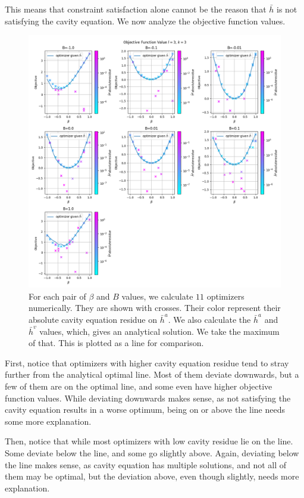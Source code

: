 \documentclass[12pt]{article}
\numberwithin{equation}{section}
\begin{document}
This means that constraint satisfaction alone cannot be the reason that $\bar{h}$ is not satisfying the cavity equation.
We now analyze the objective function values.
\begin{figure}[!h]
    \centering
    \includegraphics[width=18cm]{img/Ising_bptt/OBJ_l=3_k=3.png}
    \caption{For each pair of $\beta$ and $B$ values, we calculate $11$ optimizers numerically. They are shown with crosses.
        Their color represent their absolute cavity equation residue on $\bar{h}^a$. We also calculate the $\bar{h}^a$ and
        $\bar{h}^v$ values, which, gives an analytical solution. We take the maximum of that. This is plotted as a line for comparison.}
    \label{Fig.ISBP-OBJ-l3k3}
\end{figure}

\newpage

First, notice that optimizers with higher cavity equation residue tend to stray further from the analytical optimal line.
Most of them deviate downwards, but a few of them are on the optimal line, and some even have higher objective function values.
While deviating downwards makes sense, as not satisfying the cavity equation results in a worse optimum, being
on or above the line needs some more explanation.

Then, notice that while most optimizers with low cavity residue lie on the line. Some deviate below the line, and some go slightly
above. Again, deviating below the line makes sense, as cavity equation has multiple solutions, and not all of them may be optimal,
but the deviation above, even though slightly, needs more explanation.
\end{document}
